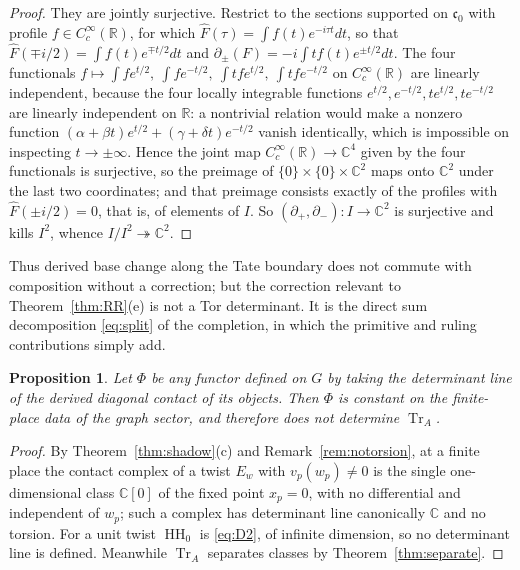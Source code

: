 \documentclass[11pt]{amsart}
\newtheorem{proposition}[theorem]{Proposition}
\theoremstyle{definition}
\theoremstyle{remark}
\newcommand{\C}{\mathbb C}
\newcommand{\R}{\mathbb R}
\newcommand{\Tr}{\operatorname{Tr}}
\newcommand{\HH}{\operatorname{HH}}
\begin{document}
\begin{proof}
They are jointly surjective.  Restrict to the sections supported on
$\mathfrak c_0$ with profile $f\in C_c^{\infty}(\R)$, for which
$\widehat F(\tau)=\int f(t)e^{-i\tau t}dt$, so that $\widehat F(\mp
i/2)=\int f(t)e^{\mp t/2}dt$ and
$\partial_{\pm}(F)=-i\int tf(t)e^{\pm t/2}dt$.  The four functionals
$f\mapsto\int fe^{t/2},\ \int fe^{-t/2},\ \int tfe^{t/2},\ \int tfe^{-t/2}$ on
$C_c^{\infty}(\R)$ are linearly independent, because the four locally
integrable functions $e^{t/2},e^{-t/2},te^{t/2},te^{-t/2}$ are linearly
independent on $\R$: a nontrivial relation would make a nonzero function
$(\alpha+\beta t)e^{t/2}+(\gamma+\delta t)e^{-t/2}$ vanish identically, which is
impossible on inspecting $t\to\pm\infty$.  Hence the joint map
$C_c^{\infty}(\R)\to\C^{4}$ given by the four functionals is surjective, so the
preimage of $\{0\}\times\{0\}\times\C^{2}$ maps onto $\C^{2}$ under the last
two coordinates; and that preimage consists exactly of the profiles with
$\widehat F(\pm i/2)=0$, that is, of elements of $I$.  So
$(\partial_+,\partial_-):I\to\C^{2}$ is surjective and kills $I^{2}$, whence
$I/I^{2}\twoheadrightarrow\C^{2}$.
\end{proof}

Thus derived base change along the Tate boundary does not commute with
composition without a correction; but the correction relevant to
Theorem~\ref{thm:RR}(e) is not a Tor determinant.  It is the direct sum
decomposition \eqref{eq:split} of the completion, in which the primitive and
ruling contributions simply add.

\begin{proposition}\label{prop:contactblind}
Let $\Phi$ be any functor defined on $G$ by taking the determinant line of the
derived diagonal contact of its objects.  Then $\Phi$ is constant on the
finite-place data of the graph sector, and therefore does not determine
$\Tr_A$.
\end{proposition}

\begin{proof}
By Theorem~\ref{thm:shadow}(c) and Remark~\ref{rem:notorsion}, at a finite
place the contact complex of a twist $E_w$ with $v_p(w_p)\ne0$ is the single
one-dimensional class $\C[0]$ of the fixed point $x_p=0$, with no differential
and independent of $w_p$; such a complex has determinant line canonically $\C$
and no torsion.  For a unit twist $\HH_0$ is \eqref{eq:D2}, of infinite
dimension, so no determinant line is defined.  Meanwhile $\Tr_A$ separates classes by
Theorem~\ref{thm:separate}.
\end{proof}
\end{document}
